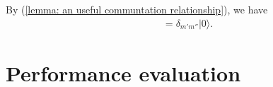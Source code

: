 \documentclass[../../note.tex]{subfiles}
\begin{document}
\begin{corollary}
    By (\ref{lemma: an useful communtation relationship}), we have
    \begin{align}
        [B_{m'},B_{m''}^\dagger]
        &= \delta_{m'm''} \vert 0 \rangle.
    \end{align}
\end{corollary}

\section{Performance evaluation}

\begin{lemma}
    \begin{align}
    \end{align}
\end{lemma}
\end{document}
